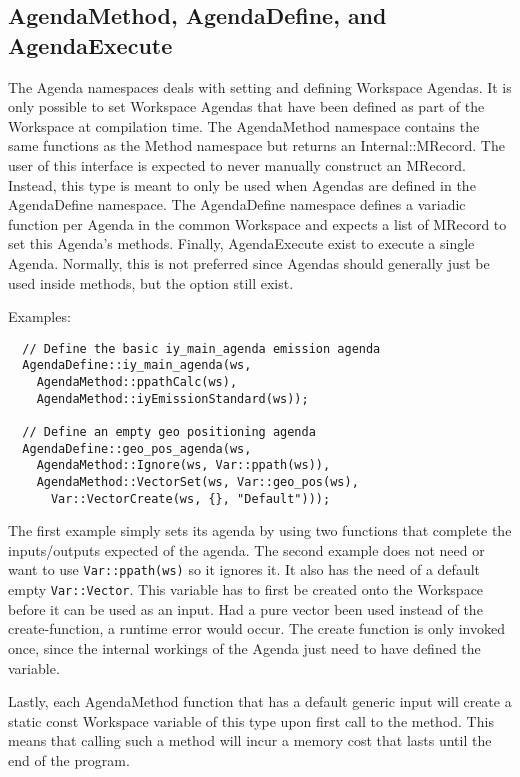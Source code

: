 \subsection{AgendaMethod, AgendaDefine, and AgendaExecute}
\label{sec:cpp_api:usage:agenda}
The Agenda namespaces deals with setting and defining Workspace Agendas.
It is only possible to set Workspace Agendas that have been defined as part
of the Workspace at compilation time.  The AgendaMethod namespace contains
the same functions as the Method namespace but returns an Internal::MRecord.
The user of this interface is expected to never manually construct an MRecord.
Instead, this type is meant to only be used when Agendas are defined in the
AgendaDefine namespace.  The AgendaDefine namespace defines a variadic 
function per Agenda in the common Workspace and expects a list of MRecord
to set this Agenda's methods.  Finally, AgendaExecute exist to execute a single
Agenda.  Normally, this is not preferred since Agendas should generally just
be used inside methods, but the option still exist.

Examples:
\begin{verbatim}
  // Define the basic iy_main_agenda emission agenda
  AgendaDefine::iy_main_agenda(ws,
    AgendaMethod::ppathCalc(ws),
    AgendaMethod::iyEmissionStandard(ws));
  
  // Define an empty geo positioning agenda
  AgendaDefine::geo_pos_agenda(ws,
    AgendaMethod::Ignore(ws, Var::ppath(ws)),
    AgendaMethod::VectorSet(ws, Var::geo_pos(ws),
      Var::VectorCreate(ws, {}, "Default")));
\end{verbatim}
The first example simply sets its agenda by using two functions that
complete the inputs/outputs expected of the agenda.  The second example
does not need or want to use \verb|Var::ppath(ws)| so it ignores it.  It also
has the need of a default empty \verb|Var::Vector|.  This variable
has to first be created onto the Workspace before it can be used as an 
input.  Had a pure vector been used instead of the create-function,
a runtime error would occur.  The create function is only invoked once,
since the internal workings of the Agenda just need to have defined
the variable.

Lastly, each AgendaMethod function that has a default generic input will
create a static const Workspace variable of this type upon first call to
the method.  This means that calling such a method will incur a memory cost
that lasts until the end of the program.
